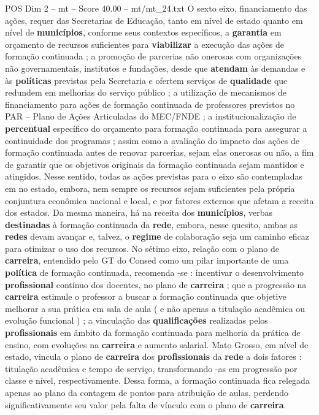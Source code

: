 \begin{textsample}{POS Dim 2 – mt – Score 40.00 – mt/mt\_24.txt}
O sexto eixo, financiamento das ações, requer das Secretarias de Educação, tanto em nível de estado quanto em nível de \textbf{municípios}, conforme seus contextos específicos, a \textbf{garantia} em orçamento de recursos suficientes para \textbf{viabilizar} a execução das ações de formação continuada ; a promoção de parcerias não onerosas com organizações não governamentais, institutos e fundações, desde que \textbf{atendam} às demandas e às \textbf{políticas} previstas pela Secretaria e ofertem serviços de \textbf{qualidade} que redundem em melhorias do serviço público ; a utilização de mecanismos de financiamento para ações de formação continuada de professores previstos no PAR – Plano de Ações Articuladas do MEC/FNDE ; a institucionalização de \textbf{percentual} específico do orçamento para formação continuada para assegurar a continuidade dos programas ; assim como a avaliação do impacto das ações de formação continuada antes de renovar parcerias, sejam elas onerosas ou não, a fim de garantir que os objetivos originais da formação continuada sejam mantidos e atingidos.
Nesse sentido, todas as ações previstas para o eixo são contempladas em no estado, embora, nem sempre os recursos sejam suficientes pela própria conjuntura econômica nacional e local, e por fatores externos que afetam a receita dos estados.
Da mesma maneira, há na receita dos \textbf{municípios}, verbas \textbf{destinadas} à formação continuada da \textbf{rede}, embora, nesse quesito, ambas as \textbf{redes} devam avançar e, talvez, o \textbf{regime} de colaboração seja um caminho eficaz para otimizar o uso dos recursos.
No sétimo eixo, relação com o plano de \textbf{carreira}, entendido pelo GT do Consed como um pilar importante de uma \textbf{política} de formação continuada, recomenda -se : incentivar o desenvolvimento \textbf{profissional} contínuo dos docentes, no plano de \textbf{carreira} ; que a progressão na \textbf{carreira} estimule o professor a buscar a formação continuada que objetive melhorar a sua prática em sala de aula ( e não apenas a titulação acadêmica ou evolução funcional ) ; a vinculação das \textbf{qualificações} realizadas pelos \textbf{profissionais} em âmbito da formação continuada para melhoria da prática de ensino, com evoluções na \textbf{carreira} e aumento salarial.
Mato Grosso, em nível de estado, vincula o plano de \textbf{carreira} dos \textbf{profissionais} da \textbf{rede} a dois fatores : titulação acadêmica e tempo de serviço, transformando -as em progressão por classe e nível, respectivamente.
Dessa forma, a formação continuada fica relegada apenas ao plano da contagem de pontos para atribuição de aulas, perdendo significativamente seu valor pela falta de vínculo com o plano de \textbf{carreira}.

\end{textsample}

